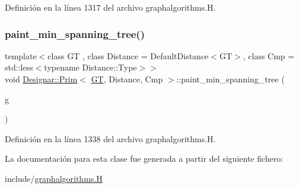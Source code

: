 Definición en la línea 1317 del archivo graphalgorithms.\+H.

\mbox{\label{class_designar_1_1_prim_a34cd263d3ccef0be04a710bde8d6aa68}} 
\subsubsection{\texorpdfstring{paint\+\_\+min\+\_\+spanning\+\_\+tree()}{paint\_min\_spanning\_tree()}\hspace{0.1cm}{\footnotesize\ttfamily [2/2]}}
{\footnotesize\ttfamily template$<$class GT , class Distance  = Default\+Distance$<$\+G\+T$>$, class Cmp  = std\+::less$<$typename Distance\+::\+Type$>$$>$ \\
void \hyperlink{class_designar_1_1_prim}{Designar\+::\+Prim}$<$ \hyperlink{demo-buildgraph_8_c_a3001c40d2c31ca87ed96cd7d1334a55e}{GT}, Distance, Cmp $>$\+::paint\+\_\+min\+\_\+spanning\+\_\+tree (\begin{DoxyParamCaption}\item[{\hyperlink{demo-buildgraph_8_c_a3001c40d2c31ca87ed96cd7d1334a55e}{GT} \&}]{g }\end{DoxyParamCaption})\hspace{0.3cm}{\ttfamily [inline]}}



Definición en la línea 1338 del archivo graphalgorithms.\+H.



La documentación para esta clase fue generada a partir del siguiente fichero\+:\begin{DoxyCompactItemize}
\item 
include/\hyperlink{graphalgorithms_8_h}{graphalgorithms.\+H}\end{DoxyCompactItemize}
